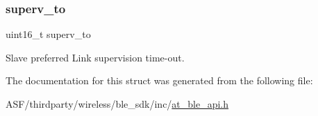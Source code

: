 \subsubsection{\texorpdfstring{superv\_to}{superv\_to}}
{\footnotesize\ttfamily uint16\+\_\+t superv\+\_\+to}



Slave preferred Link supervision time-\/out. 



The documentation for this struct was generated from the following file\+:\begin{DoxyCompactItemize}
\item 
A\+S\+F/thirdparty/wireless/ble\+\_\+sdk/inc/\mbox{\hyperlink{at__ble__api_8h}{at\+\_\+ble\+\_\+api.\+h}}\end{DoxyCompactItemize}
